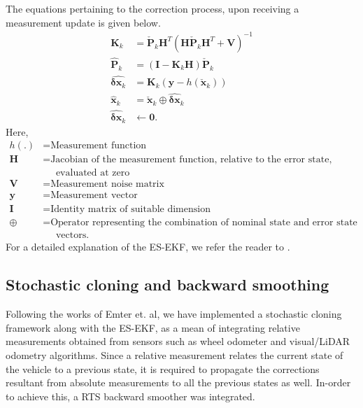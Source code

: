 The equations pertaining to the correction process, upon receiving a measurement update is given below.
\begin{align}
    \textbf{K}_k &= \check{\textbf{P}}_k\textbf{H}^T\left(\textbf{H}\check{\textbf{P}}_k\textbf{H}^T+\textbf{V}\right)^{-1} \\
    \hat{\textbf{P}}_k &= \left(\textbf{I}-\textbf{K}_k\textbf{H}\right)\check{\textbf{P}}_k\\
	\hat{\boldsymbol{\delta}\textbf{x}_k} &= \textbf{K}_k \left(\textbf{y}-h\left(\check{\textbf{x}}_k\right)\right)\\
	\hat{\textbf{x}}_k &= \check{\textbf{x}}_k \oplus \hat{\boldsymbol{\delta}\textbf{x}}_k\\
	\hat{\boldsymbol{\delta}\textbf{x}}_k & \leftarrow \textbf{0}.
\end{align}
Here,
\begin{align}
	h(.) &= \text{Measurement function}\\
	\textbf{H} &= \text{Jacobian of the measurement function, relative to the error state,}\nonumber\\
	&\quad\text{ evaluated at zero}\\
	\textbf{V} &= \text{Measurement noise matrix}\\
	\textbf{y} &= \text{Measurement vector}\\
	\textbf{I} &= \text{Identity matrix of suitable dimension}\\
	\oplus &= \text{Operator representing the combination of nominal state and error state }\nonumber\\
	&\quad\text{ vectors}.
\end{align}
For a detailed explanation of the \gls{ES-EKF}, we refer the reader to \cite{pa:Sola2017QuaternionKinematics}.

\subsection{Stochastic cloning and backward smoothing}
Following the works of Emter et. al\cite{pa:Emter2018StochasticCloning},  we have implemented a stochastic cloning framework along with the \gls{ES-EKF}, as a mean of integrating relative measurements obtained from sensors such as wheel odometer and visual/\gls{LiDAR} odometry algorithms. Since a relative measurement relates the current state of the vehicle to a previous state, it is required to propagate the corrections resultant from absolute measurements to all the previous states as well. In-order to achieve this, a \gls{RTS} backward smoother was integrated.



